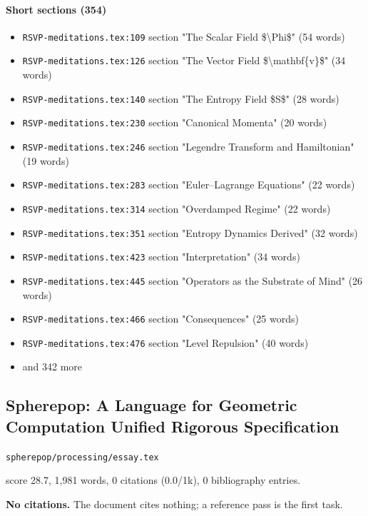 \documentclass[11pt]{article}
\newcommand{\loc}[1]{{\small\color{muted}\texttt{#1}}}
\begin{document}
\paragraph{Short sections (354)}
\begin{itemize}
\item \loc{RSVP-meditations.tex:109} section "The Scalar Field \$\textbackslash{}Phi\$" (54 words)
\item \loc{RSVP-meditations.tex:126} section "The Vector Field \$\textbackslash{}mathbf\{v\}\$" (34 words)
\item \loc{RSVP-meditations.tex:140} section "The Entropy Field \$S\$" (28 words)
\item \loc{RSVP-meditations.tex:230} section "Canonical Momenta" (20 words)
\item \loc{RSVP-meditations.tex:246} section "Legendre Transform and Hamiltonian" (19 words)
\item \loc{RSVP-meditations.tex:283} section "Euler--Lagrange Equations" (22 words)
\item \loc{RSVP-meditations.tex:314} section "Overdamped Regime" (22 words)
\item \loc{RSVP-meditations.tex:351} section "Entropy Dynamics Derived" (32 words)
\item \loc{RSVP-meditations.tex:423} section "Interpretation" (34 words)
\item \loc{RSVP-meditations.tex:445} section "Operators as the Substrate of Mind" (26 words)
\item \loc{RSVP-meditations.tex:466} section "Consequences" (25 words)
\item \loc{RSVP-meditations.tex:476} section "Level Repulsion" (40 words)
\item[] {\color{muted}\small and 342 more}
\end{itemize}
\subsection{Spherepop: A Language for Geometric Computation Unified Rigorous Specification}
\loc{spherepop/\allowbreak{}processing/\allowbreak{}essay.tex}\par
score 28.7, 1,981 words, 0 citations (0.0/1k), 0 bibliography entries.

\textbf{No citations.} The document cites nothing; a reference pass is the first task.
\end{document}

